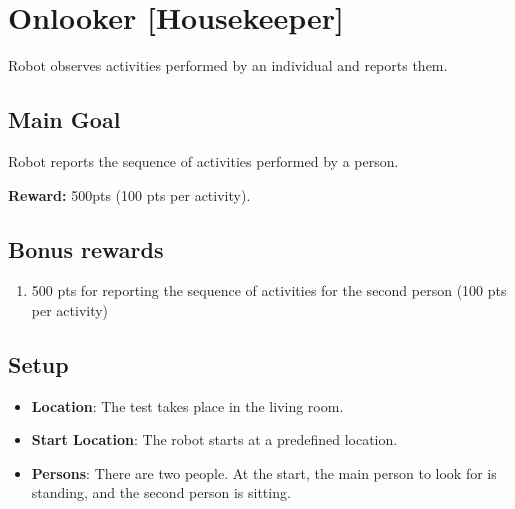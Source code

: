 \section{Onlooker [Housekeeper]}
Robot observes activities performed by an individual and reports them. 

\subsection{Main Goal}
Robot reports the sequence of activities performed by a person.

\noindent\textbf{Reward:} 500pts (100 pts per activity).

\subsection{Bonus rewards}
\begin{enumerate}[nosep]
	\item 500 pts for reporting the sequence of activities for the second person (100 pts per activity)
\end{enumerate}


\subsection{Setup}
\begin{itemize}
	\item \textbf{Location}: The test takes place in the living room.

	\item \textbf{Start Location}: The robot starts at a predefined location.

	\item \textbf{Persons}: There are two people. At the start, the main person to look for is standing, and the second person is sitting.
\end{itemize}


